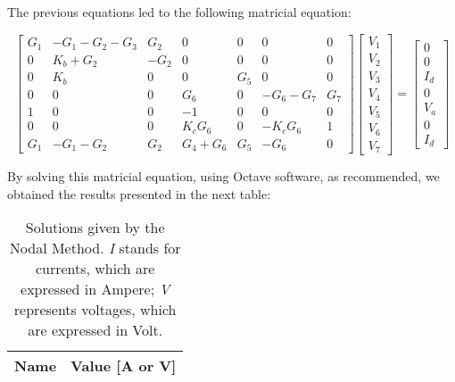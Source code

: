 \vspace{1cm}

The previous equations led to the following matricial equation:

\begin{equation}
	\begin{bmatrix}
		G_1 & -G_1 - G_2 - G_3 & G_2 & 0 & 0 & 0 & 0 \\
		0 & K_b + G_2 & -G_2 & 0 & 0 & 0 & 0 \\
		0 & K_b & 0 & 0 & G_5 & 0 & 0 \\
		0 & 0 & 0 & G_6 & 0 & -G_6 - G_7 & G_7 \\
		1 & 0 & 0 & -1 & 0 & 0 & 0 \\
		0 & 0 & 0 & K_cG_6 & 0 & -K_cG_6 & 1 \\
		G_1 & -G_1-G_2 & G_2 & G_4 + G_6 & G_5 & -G_6 & 0 
	\end{bmatrix}
	\begin{bmatrix}
		V_1 \\
		V_2 \\
		V_3 \\
		V_4 \\
		V_5 \\
		V_6 \\
		V_7 
	\end{bmatrix}
	=  
	\begin{bmatrix}
		0 \\
		0 \\
		I_d \\
		0 \\
		V_a \\
		0 \\
		I_d
	\end{bmatrix}
\end{equation}

\vspace{1cm}
\vspace{1cm}


By solving this matricial equation, using Octave software, as recommended, we obtained the results presented in the next table:

\vspace{0.3cm}

\begin{table}[h]
	\centering
	\begin{tabular}{|l|r|}
		\hline    
		{\bf Name} & {\bf Value [A or V]} \\ \hline
		
	\end{tabular}
	\caption{Solutions given by the Nodal Method. {\em I} stands for currents, which
		are expressed in Ampere; {\it V} represents voltages, which are expressed in
		Volt.}
	\label{tab:nodal}
\end{table}

\pagebreak
